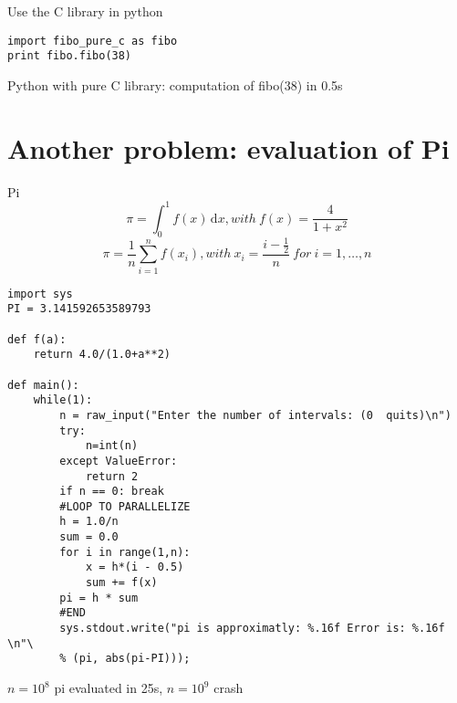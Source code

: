 \documentclass[12pt]{beamer}
\begin{document}
\begin{frame}[fragile]
  \begin{block}{Use the C library in python}
    \begin{verbatim}
import fibo_pure_c as fibo
print fibo.fibo(38)
    \end{verbatim}    
  \end{block}
  Python with pure C library: computation of fibo(38) in 0.5s
\end{frame}

\section{Another problem: evaluation of Pi}
\begin{frame}
  \begin{block}{}
  \end{block}
\end{frame}

\begin{frame}
  \begin{block}{Pi}
    \begin{equation}
      \label{eq:1}
      \pi = \int_0^1 f(x) \, \mathrm dx , with \ f(x) = \frac{4}{1+x^2}
    \end{equation}
    \begin{equation}
      \label{eq:2}
      \pi = \frac{1}{n} \sum_{i=1}^{n} f(x_i) , with\ x_i = \frac{i-\frac{1}{2}}{n}\ for\ i=1,\dots,n
    \end{equation}
  \end{block}
\end{frame}

\begin{frame}[fragile]
    \begin{verbatim}
import sys
PI = 3.141592653589793

def f(a):
    return 4.0/(1.0+a**2)

def main():
    while(1):
        n = raw_input("Enter the number of intervals: (0  quits)\n")
        try:
            n=int(n)
        except ValueError:
            return 2
        if n == 0: break
        #LOOP TO PARALLELIZE
        h = 1.0/n
        sum = 0.0
        for i in range(1,n):
            x = h*(i - 0.5)
            sum += f(x)
        pi = h * sum
        #END
        sys.stdout.write("pi is approximatly: %.16f Error is: %.16f \n"\
        % (pi, abs(pi-PI)));
    \end{verbatim}
$n = 10^8$ pi evaluated in 25s, $n = 10^9$ crash
\end{frame}
\end{document}
